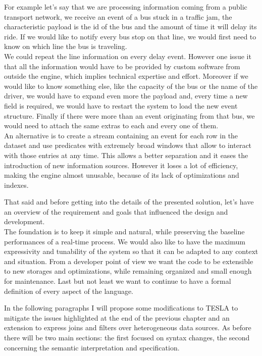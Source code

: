 For example let's say that we are processing information coming from a public transport network, we receive an event of a bus stuck in a traffic jam, the characteristic payload is the id of the bus and the amount of time it will delay its ride. If we would like to notify every bus stop on that line, we would first need to know on which line the bus is traveling.\\
We could repeat the line information on every delay event. However one issue it that all the information would have to be provided by custom software from outside the engine, which implies technical expertise and effort. Moreover if we would like to know something else, like the capacity of the bus or the name of the driver, we would have to expand even more the payload and, every time a new field is required, we would have to restart the system to load the new event structure. Finally if there were more than an event originating from that bus, we would need to attach the same extras to each and every one of them.\\
An alternative is to create a stream containing an event for each row in the dataset and use predicates with extremely broad windows that allow to interact with those entries at any time. This allows a better separation and it eases the introduction of new information sources. However it loses a lot of efficiency, making the engine almost unusable, because of its lack of optimizations and indexes.

That said and before getting into the details of the presented solution, let's have an overview of the requirement and goals that influenced the design and development.\\
The foundation is to keep it simple and natural, while preserving the baseline performances of a real-time process. We would also like to have the maximum expressivity and tunability of the system so that it can be adapted to any context and situation. From a developer point of view we want the code to be extensible to new storages and optimizations, while remaining organized and small enough for maintenance. Last but not least we want to continue to have a formal definition of every aspect of the language.

In the following paragraphs I will propose some modifications to TESLA to mitigate the issues highlighted at the end of the previous chapter and an extension to express joins and filters over heterogeneous data sources. As before there will be two main sections: the first focused on syntax changes, the second concerning the semantic interpretation and specification.

